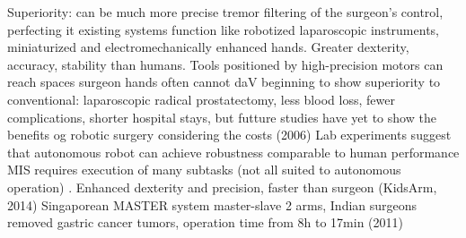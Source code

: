 Superiority:
can be much more precise
tremor filtering of the surgeon's control, perfecting it
existing systems function like robotized laparoscopic instruments, miniaturized and electromechanically enhanced hands. Greater dexterity, accuracy, stability than humans. Tools positioned by high-precision motors can reach spaces surgeon hands often cannot \citep{bib:docatadist}
daV beginning to show superiority to  conventional: laparoscopic radical prostatectomy, less blood loss, fewer complications, shorter hospital stays, but futture studies have yet to show the benefits og robotic surgery considering the costs (2006) \citep{bib:docatadist}
Lab experiments suggest that autonomous robot can achieve robustness comparable to human performance \citep{bib:raven_debride}
MIS requires execution of many subtasks (not all suited to autonomous operation) \citep{bib:raven_debride}.
Enhanced dexterity and precision, faster than surgeon (KidsArm, 2014)
Singaporean MASTER system master-slave 2 arms, Indian surgeons removed gastric cancer tumors, operation time from 8h to 17min (2011)

